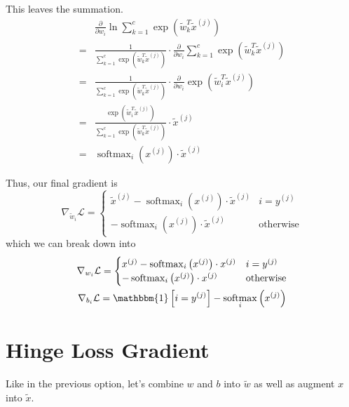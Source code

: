 \documentclass[12pt]{article}
\DeclareMathOperator{\softmax}{softmax}
\begin{document}
This leaves the summation.
\begin{align*}
          & \frac{\partial}{\partial w_i} \ln \sum_{k=1}^{c} \exp\left(\tilde{w}^T_{k} \tilde{x}^{(j)}\right)                                                                             \\
      ={} & \frac{1}{\sum_{k=1}^{c} \exp\left(\tilde{w}^T_{k} \tilde{x}^{(j)}\right)} \cdot \frac{\partial}{\partial w_i} \sum_{k=1}^{c} \exp\left(\tilde{w}^T_{k} \tilde{x}^{(j)}\right) \\
      ={} & \frac{1}{\sum_{k=1}^{c} \exp\left(\tilde{w}^T_{k} \tilde{x}^{(j)}\right)} \cdot \frac{\partial}{\partial w_i} \exp\left(\tilde{w}^T_{i} \tilde{x}^{(j)}\right)                \\
      ={} & \frac{\exp\left(\tilde{w}^T_{i} \tilde{x}^{(j)}\right)}{\sum_{k=1}^{c} \exp\left(\tilde{w}^T_{k} \tilde{x}^{(j)}\right)} \cdot \tilde{x}^{(j)}                                \\
      ={} & \softmax_i\left(x^{(j)}\right) \cdot \tilde{x}^{(j)}
\end{align*}

Thus, our final gradient is
\[\nabla_{\tilde{w}_i} \mathcal{L}=\begin{cases}
            \tilde{x}^{(j)}-\softmax_i\left(x^{(j)}\right) \cdot \tilde{x}^{(j)} & i=y^{(j)} \\
            -\softmax_i\left(x^{(j)}\right) \cdot \tilde{x}^{(j)}                 & \text{otherwise}
      \end{cases}\]
which we can break down into
\begin{gather*}
      \nabla_{w_i} \mathcal{L}=\begin{cases}
            x^{(j)}-\softmax_i\left(x^{(j)}\right) \cdot x^{(j)} & i=y^{(j)} \\
            -\softmax_i\left(x^{(j)}\right) \cdot x^{(j)}                 & \text{otherwise}
      \end{cases} \\
      \nabla_{b_i} \mathcal{L}=\mathbbm{1}\left[i=y^{(j)}\right]-\softmax_i\left(x^{(j)}\right)
\end{gather*}

\pagebreak

\section{Hinge Loss Gradient}

Like in the previous option, let's combine $w$ and $b$ into $\tilde{w}$
as well as augment $x$ into $\tilde{x}$.
\end{document}
